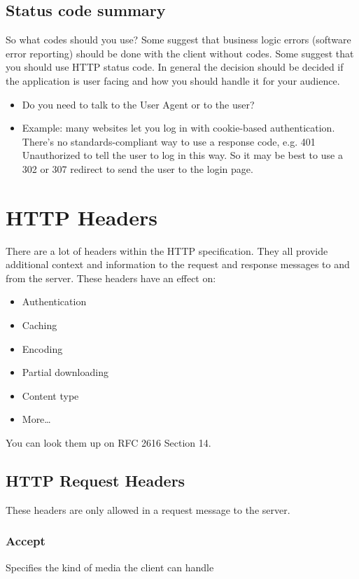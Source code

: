 \documentclass[../CMPUT-404-Notes.tex]{subfiles}
\begin{document}
\subsection{Status code summary} 
So what codes should you use?
Some suggest that business logic errors (software error reporting) should be done with the client without codes.
Some suggest that you should use HTTP status code. 
In general the decision should be decided if the application is user facing and how you should handle it for your audience.
\begin{itemize}
  \item Do you need to talk to the User Agent or to the user?
  \item Example: many websites let you log in with cookie-based authentication. There's no standards-compliant way to use a response code, e.g. 401 Unauthorized to tell the user to log in this way. So it may be best to use a 302 or 307 redirect to send the user to the login page.
\end{itemize}

\section{HTTP Headers}
There are a lot of headers within the HTTP specification. They all provide additional context and information to the request and response messages to and from the server. 
These headers have an effect on:
\begin{itemize}
  \item Authentication
  \item Caching 
  \item Encoding 
  \item Partial downloading
  \item Content type 
  \item More\dots
\end{itemize}
You can look them up on RFC 2616 Section 14.

\subsection{HTTP Request Headers}
These headers are only allowed in a request message to the server.

\subsubsection{Accept}
Specifies the kind of media the client can handle
\end{document}
